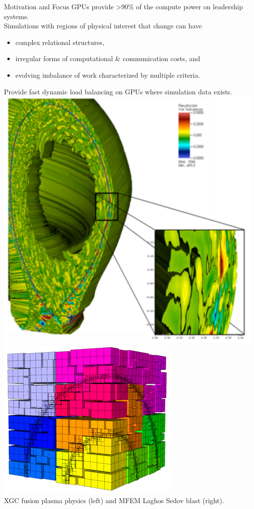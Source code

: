 \documentclass[final]{beamer}
\newlength{\onecolwid}
\begin{document}
\begin{frame}[t]
\begin{columns}[t]
\begin{column}{\onecolwid}
\begin{alertblock}{Motivation and Focus}
  GPUs provide >90\% of the compute power on leadership systems.\\
  Simulations with regions of physical interest that change can have\\
  \begin{itemize}
    \item complex relational structures,
    \item irregular forms of computational \& communication costs, and
    \item evolving imbalance of work characterized by multiple criteria.
  \end{itemize}
  Provide fast dynamic load balancing on GPUs where simulation data exists. \\
  \vskip1cm
  \includegraphics[width=.45\textwidth]{../salishan2019/figures/xgcCase.png}
  \includegraphics[width=.45\textwidth]{../salishan2019/figures/laghos_sedov.png}\\
  \small{XGC fusion plasma physics (left) and MFEM Laghos Sedov blast
  (right).}
\end{alertblock}



\end{column}
\end{columns}
\end{frame}
\end{document}
